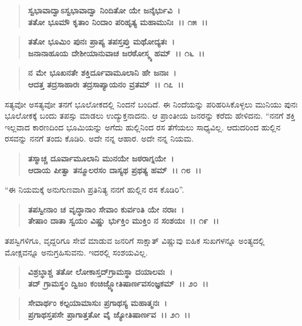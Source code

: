 \begin{verse}
\textbf{ಸ್ವಭಾವಾದ್ವಾಽಸ್ವಭಾವಾದ್ವಾ ನಿಂದಿತೋ ಯೇ ಜನೈರ್ಭುವಿ~।}\\\textbf{ತತೋ ಭೂಮೌ ಕೃತಾಂ ನಿಂದಾಂ ಪರಿಹೃತ್ಯ ಮಹಾಮುನಿಃ~।। ೧೫~।। }
\end{verse}

\begin{verse}
\textbf{ತತೋ ಭೂಮಿಂ ಪುನಃ ಪ್ರಾಪ್ಯ ತಪಸ್ತಪ್ತು ಮಥೋದ್ಯತಃ~।}\\\textbf{ಜನಾನಾಹೂಯ ದೇಶೀಯಾನುವಾಚ ಜರಠೋಸ್ಮ್ಯ ಹಮ್~।। ೧೬~।।} 
\end{verse}

\begin{verse}
\textbf{ನ ಮೇ ಭೂಖನತೇ ಶಕ್ತಿರ್ದೂವಾಮೂಲಾನಿ ಹೇ ಜನಾಃ~।}\\\textbf{ಆದತ್ತ ತದ್ರಸಾಹಾರಃ ತದ್ರಸಾಪ್ಯಾಯನಂ ವ್ರತಮ್~।। ೧೭~।।}
\end{verse}

ಸತ್ಯವೋ ಅಸತ್ಯವೋ ತನಗೆ ಭೂಲೋಕದಲ್ಲಿ ನಿಂದನೆ ಬಂದಿದೆ. ಈ ನಿಂದೆಯನ್ನು ಪರಿಹರಿಸಿಕೊಳ್ಳಲು ಮುನಿಯು ಪುನಃ ಭೂಲೋಕಕ್ಕೆ ಬಂದು ತಪಸ್ಸು ಮಾಡಲು ಉದ್ಯುಕ್ತನಾದನು. ಆ ಪ್ರಾಂತೀಯ ಜನರನ್ನು ಕರೆದು ಹೇಳಿದನು. “ನನಗೆ ಶಕ್ತಿ ಇಲ್ಲವಾದ ಕಾರಣದಿಂದ ಭೂಮಿಯನ್ನು ಅಗೆದು ಹುಲ್ಲಿನಿಂದ ರಸ ತೆಗೆಯಲು ಸಾಧ್ಯವಿಲ್ಲ. ಆದುದರಿಂದ ಹುಲ್ಲಿನ ರಸವನ್ನು ನನಗೆ ತಂದು ಕೊಡಿರಿ. ಅದೇ ನನ್ನ ಆಹಾರ. ಅದೇ ನನ್ನ ನಿಯಮ.

\begin{verse}
\textbf{ತಸ್ಮಾಚ್ಚ ದೂರ್ವಾಮೂಲಾನಿ ಮುನಯೇ ಜಠರಾಗ್ನಯೇ~।}\\\textbf{ಆದಾಯ ಪೀತ್ವಾ ತನ್ಮೂಲರಸಂ ದಾಸ್ಯಥ ಪ್ರಥತ್ಯ ಹಮ್~।। ೧೮~।। }
\end{verse}

“ಈ ನಿಯಮಕ್ಕೆ ಅನುಗುಣವಾಗಿ ಪ್ರತಿನಿತ್ಯ ನನಗೆ ಹುಲ್ಲಿನ ರಸ ಕೊಡಿರಿ”.

\begin{verse}
\textbf{ತಪಸ್ವೀನಾಂ ಚ ವೃದ್ಧಾನಾಂ ಸೇವಾಂ ಕುರ್ವಂತಿ ಯೇ ನರಾಃ~।}\\\textbf{ತೇಷಾಂ ದಾತಾ ಸ್ವಯಂ ವಿಷ್ಣು ರ್ಭುಕ್ತಿಂ ಮುಕ್ತಿಂ ನ ಸಂಶಯಃ~।। ೧೯~।।}
\end{verse}

ತಪಸ್ವಿಗಳಿಗೂ, ವೃದ್ದರಿಗೂ ಸೇವೆ ಮಾಡುವ ಜನರಿಗೆ ಸಾಕ್ಷಾತ್ ವಿಷ್ಣುವು ಐಹಿಕ ಸುಖಗಳನ್ನೂ ಅಂತ್ಯದಲ್ಲಿ ಮೋಕ್ಷವನ್ನೂ ಅನುಗ್ರಹಿಸುವನು. ಇದರಲ್ಲಿ ಸಂಶಯವಿಲ್ಲ.

\begin{verse}
\textbf{ವಿಶ್ರಬ್ಧಾಶ್ಚ ತತೋ ಲೋಕಾಸ್ತದ್‌ಗ್ರಾಮಸ್ಥಾ ದಯಾಲವಃ~।}\\\textbf{ತದ್ ಗ್ರಾಮಸ್ಥಂ ದ್ವಿಜಂ ಕಂಚಿಜ್ಜ್ಯೋತಿಷಾರ್ಣವಸಂಜ್ಞಕಮ್~।। ೨೦~।। }
\end{verse}

\begin{verse}
\textbf{ಸೇವಾರ್ಥಂ ಕಲ್ಪಯಾಮಾಸುಃ ಪ್ರಗಾಥಸ್ಯ ಮಹಾತ್ಮನಃ~।}\\\textbf{ಪ್ರಗಾಥಸ್ತಪಸೇ ಪ್ರಾಗಾತ್ತತೋ ವೈ ಜ್ಯೋತಿಷಾರ್ಣವ~।। ೨೧~।।}
\end{verse}

